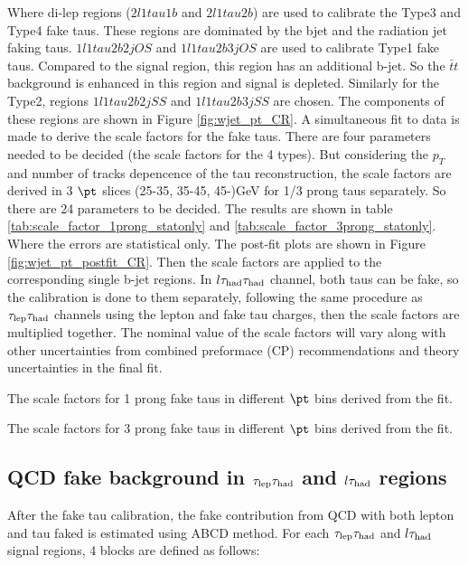 Where di-lep regions ($2l1tau1b$ and $2l1tau2b$) are used to calibrate the Type3 and Type4 fake taus. These regions are dominated by the bjet and the radiation jet faking taus. $1l1tau2b2j OS$ and $1l1tau2b3j OS$ are used to calibrate Type1 fake taus. Compared to the signal region, this region has an additional b-jet. So the $\bar{t}t$ background is enhanced in this region and signal is depleted. Similarly for the Type2, regions $1l1tau2b2j SS$ and $1l1tau2b3j SS$ are chosen. The components of these regions are shown in Figure \ref{fig:wjet_pt_CR}. A simultaneous fit to data is made to derive the scale factors for the fake taus. There are four parameters needed to be decided (the scale factors for the 4 types). But considering the $p_{T}$ and number of tracks depencence of the tau reconstruction, the scale factors are derived in 3 $\pt$ slices (25-35, 35-45, 45-)GeV for 1/3 prong taus separately. So there are 24 parameters to be decided. The results are shown in table \ref{tab:scale_factor_1prong_statonly} and \ref{tab:scale_factor_3prong_statonly}. Where the errors are statistical only. The post-fit plots are shown in Figure \ref{fig:wjet_pt_postfit_CR}. Then the scale factors are applied to the corresponding single b-jet regions. In $l\tau_\text{had}{}\tau_\text{had}$ channel, both taus can be fake, so the calibration is done to them separately, following the same procedure as $\tau_\text{lep}{}\tau_\text{had}$ channels using the lepton and fake tau charges, then the scale factors are multiplied together. The nominal value of the scale factors will vary along with other uncertainties from combined preformace (CP) recommendations and theory uncertainties in the final fit.

\begin{table}
\caption{The scale factors for 1 prong fake taus in different $\pt$ bins derived from the fit.}
\label{tab:scale_factor_1prong_statonly}

\end{table}
\begin{table}
\caption{The scale factors for 3 prong fake taus in different $\pt$ bins derived from the fit.}
\label{tab:scale_factor_3prong_statonly}

\end{table}




\subsection{QCD fake background in $\tau_\text{lep}{}\tau_\text{had}$ and $l\tau_\text{had}$ regions}
\label{sec:ABCD}
After the fake tau calibration, the fake contribution from QCD with both lepton and tau faked is estimated using ABCD method. For each $\tau_\text{lep}{}\tau_\text{had}$ and $l\tau_\text{had}$ signal regions, 4 blocks are defined as follows:

